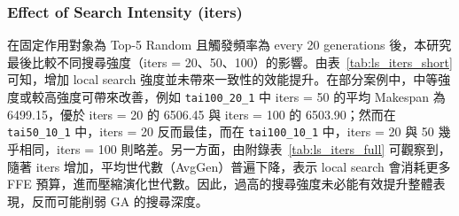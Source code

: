 \documentclass[conference]{IEEEtran}
\begin{document}
\begin{table}[htbp]
\caption{不同頻率做Local Search之平均與最小 Makespan}
\label{tab:ls_when_short}
\centering
{}
\end{table}



\subsubsection{Effect of Search Intensity (iters)}
在固定作用對象為 Top-5 Random 且觸發頻率為 every 20 generations 後，本研究最後比較不同搜尋強度（iters = 20、50、100）的影響。由表~\ref{tab:ls_iters_short} 可知，增加 local search 強度並未帶來一致性的效能提升。在部分案例中，中等強度或較高強度可帶來改善，例如 \texttt{tai100\_20\_1} 中 iters = 50 的平均 Makespan 為 6499.15，優於 iters = 20 的 6506.45 與 iters = 100 的 6503.90；然而在 \texttt{tai50\_10\_1} 中，iters = 20 反而最佳，而在 \texttt{tai100\_10\_1} 中，iters = 20 與 50 幾乎相同，iters = 100 則略差。另一方面，由附錄表~\ref{tab:ls_iters_full} 可觀察到，隨著 iters 增加，平均世代數（AvgGen）普遍下降，表示 local search 會消耗更多 FFE 預算，進而壓縮演化世代數。因此，過高的搜尋強度未必能有效提升整體表現，反而可能削弱 GA 的搜尋深度。
\end{document}
